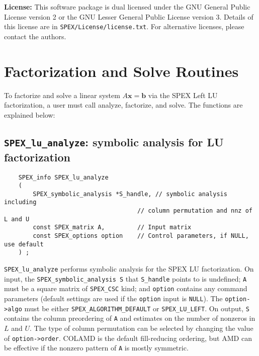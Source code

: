 \documentclass[12pt,oneside]{book}
\theoremstyle{definition}
\begin{document}
\noindent \textbf{License:} This software package is dual licensed under the GNU General Public License version 2 or the GNU Lesser General Public License version 3. Details of this license are in \verb|SPEX/License/license.txt|. For alternative licenses, please contact the authors.


\section{Factorization and Solve Routines}

To factorize and solve a linear system $A \mathbf{x} = \mathbf{b}$ via the SPEX Left LU factorization, a user must call analyze, factorize, and solve. The functions are explained below:

\subsection{\texttt{SPEX\_lu\_analyze}: symbolic analysis for LU factorization} \label{ss:spex_lu_analyze}
\begin{mdframed}[userdefinedwidth=\textwidth]
{\footnotesize
\begin{verbatim}
    SPEX_info SPEX_lu_analyze
    (
        SPEX_symbolic_analysis *S_handle, // symbolic analysis including
                                     // column permutation and nnz of L and U
        const SPEX_matrix A,         // Input matrix
        const SPEX_options option    // Control parameters, if NULL, use default
    ) ;
\end{verbatim}
} \end{mdframed}

\verb|SPEX_lu_analyze| performs symbolic analysis for the SPEX LU factorization. On input, the \verb|SPEX_symbolic_analysis S| that \verb|S_handle| points to is undefined; \verb|A| must be a square matrix of \verb|SPEX_CSC| kind; and \verb|option| contains any command parameters  (default settings are used if the \verb|option| input is \verb|NULL|). The \verb|option->algo| must be either \verb|SPEX_ALGORITHM_DEFAULT| or \verb|SPEX_LU_LEFT|. On output, \verb|S| contains the column preordering of \verb|A| and estimates on the number of nonzeros in $L$ and $U$. The type of column permutation can be selected by changing the value of \verb|option->order|.  COLAMD is the default fill-reducing ordering, but AMD can be effective if the nonzero
pattern of \verb'A' is mostly symmetric.
\end{document}
